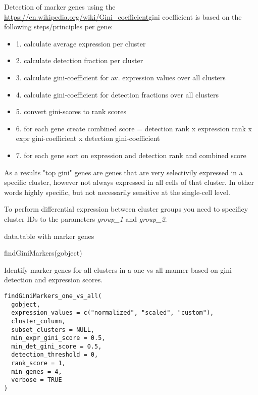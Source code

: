 \documentclass[a4paper]{book}
\begin{document}
\begin{Details}\relax
Detection of marker genes using the \url{https://en.wikipedia.org/wiki/Gini_coefficient}gini
coefficient is based on the following steps/principles per gene:
\begin{itemize}

\item{} 1. calculate average expression per cluster
\item{} 2. calculate detection fraction per cluster
\item{} 3. calculate gini-coefficient for av. expression values over all clusters
\item{} 4. calculate gini-coefficient for detection fractions over all clusters
\item{} 5. convert gini-scores to rank scores
\item{} 6. for each gene create combined score = detection rank x expression rank x expr gini-coefficient x detection gini-coefficient
\item{} 7. for each gene sort on expression and detection rank and combined score

\end{itemize}


As a results "top gini" genes are genes that are very selectivily expressed in a specific cluster,
however not always expressed in all cells of that cluster. In other words highly specific, but
not necessarily sensitive at the single-cell level.

To perform differential expression between cluster groups you need to specificy cluster IDs
to the parameters \emph{group\_1} and \emph{group\_2}.
\end{Details}
%
\begin{Value}
data.table with marker genes
\end{Value}
%
\begin{Examples}
\begin{ExampleCode}
    findGiniMarkers(gobject)
\end{ExampleCode}
\end{Examples}
%
\begin{Description}\relax
Identify marker genes for all clusters in a one vs all manner based on gini detection and expression scores.
\end{Description}
%
\begin{Usage}
\begin{verbatim}
findGiniMarkers_one_vs_all(
  gobject,
  expression_values = c("normalized", "scaled", "custom"),
  cluster_column,
  subset_clusters = NULL,
  min_expr_gini_score = 0.5,
  min_det_gini_score = 0.5,
  detection_threshold = 0,
  rank_score = 1,
  min_genes = 4,
  verbose = TRUE
)
\end{verbatim}
\end{Usage}
\end{document}
